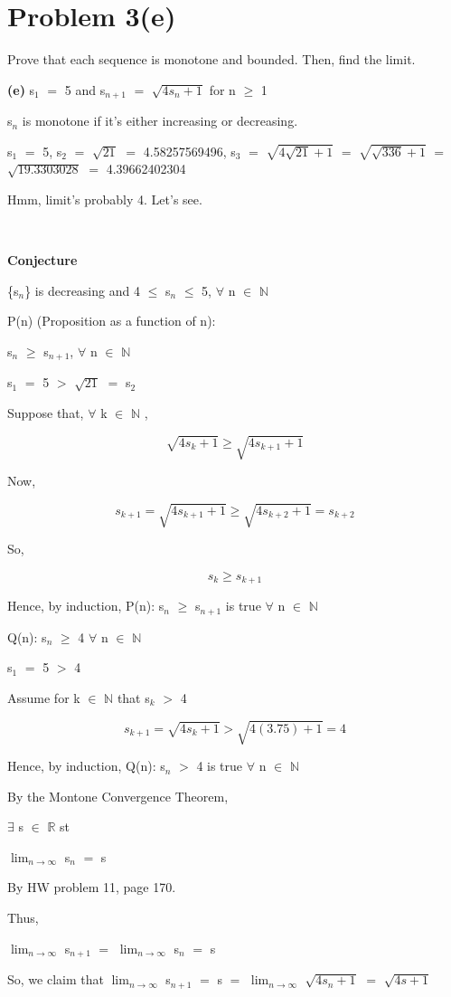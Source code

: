 \documentclass{article}
\newcommand{\mt}[1]{\ensuremath{#1}}
\newcommand\bsc[2][\DefaultOpt]{%
  \def\DefaultOpt{#2}%
  \section[#1]{#2}%
}
\newcommand{\bpth}[1]{\textbf{(#1)}}
\newcommand{\br}{\mt{\mathbb{R}} }       %
\newcommand{\bn}{\mt{\mathbb{N}} }       %
\newcommand{\fa}{\mt{\forall} }          %
\newcommand{\mem}{\mt{\in} }
\newcommand{\exs}{\mt{\exists} }
\newcommand{\bk}[1]{\{#1\}}
\newcommand{\gr}{\mt{>} }
\newcommand{\lse}{\mt{\leq} }
\newcommand{\gre}{\mt{\geq} }
\newcommand{\eql}{\mt{=} }
\newcommand{\uw}[2]{#1\mt{_{#2}}}
\newcommand{\lmti}[1]{\mt{\displaystyle{\lim_{#1 \to \infty}}}}
\newcommand{\eqn}[1]{\[#1\]}
\begin{document}
\bsc{Problem 3(e)}{
Prove that each sequence is monotone and bounded. Then, find the limit.

\bpth{e} \uw{s}{1} \eql 5 and \uw{s}{n + 1} \eql $\sqrt{4\uw{s}{n} + 1}$ for n \gre 1

\uw{s}{n} is monotone if it's either increasing or decreasing.

\uw{s}{1} \eql 5, \uw{s}{2} \eql $\sqrt{21}$ \eql 4.58257569496, \uw{s}{3} \eql $\sqrt{4\sqrt{21} + 1}$ \eql $\sqrt{\sqrt{336} + 1}$ \eql $\sqrt{19.3303028}$ \eql 4.39662402304

Hmm, limit's probably 4. Let's see. \

\

\textbf{Conjecture}

\bk{\uw{s}{n}} is decreasing and 4 \lse \uw{s}{n} \lse 5, \fa n \mem \bn

P(n) (Proposition as a function of n):

\uw{s}{n} \gre \uw{s}{n + 1}, \fa n \mem \bn 

\uw{s}{1} \eql 5 \gr $\sqrt{21}$ \eql \uw{s}{2}

Suppose that, \fa k \mem \bn,

\eqn{\sqrt{4\uw{s}{k} + 1} \gre \sqrt{4\uw{s}{k + 1} + 1}}

Now,

\eqn{s_{k + 1} = \sqrt{4\uw{s}{k + 1} + 1} \gre \sqrt{4\uw{s}{k + 2} + 1} = s_{k + 2}}

So,

\eqn{s_k \gre s_{k + 1}}

Hence, by induction, P(n): \uw{s}{n} \gre \uw{s}{n + 1} is true \fa n \mem \bn 

Q(n): \uw{s}{n} \gre 4 \fa n \mem \bn

\uw{s}{1} \eql 5 \gr 4

Assume for k \mem \bn that \uw{s}{k} \gr 4

\eqn{s_{k + 1} = \sqrt{4\uw{s}{k} + 1} \gr \sqrt{4(3.75) + 1} = 4}

Hence, by induction, Q(n): \uw{s}{n} \gr 4 is true \fa n \mem \bn 

By the Montone Convergence Theorem,

\exs s \mem \br st

\lmti{n} \uw{s}{n} \eql s

By HW problem 11, page 170.

Thus,

\lmti{n} \uw{s}{n + 1} \eql \lmti{n} \uw{s}{n} \eql s

So, we claim that \lmti{n} \uw{s}{n + 1} \eql s \eql \lmti{n} $\sqrt{4s_n + 1}$ \eql $\sqrt{4s + 1}$

}
\end{document}
